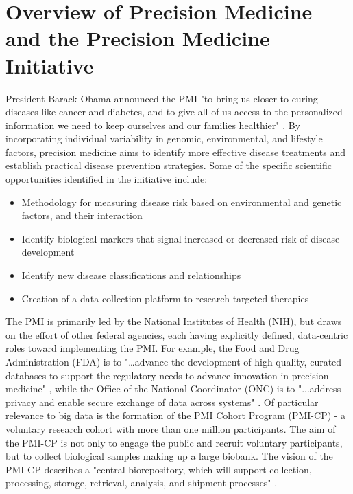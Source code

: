 \section{Overview of Precision Medicine and the Precision Medicine Initiative}
President Barack Obama announced the PMI "to bring us closer to curing diseases like cancer and diabetes, and to give all of us access to the personalized information we need to keep ourselves and our families healthier" \cite{obamaVid}\cite{Terry2015}. By incorporating individual variability in genomic, environmental, and lifestyle factors, precision medicine aims to identify more effective disease treatments and establish practical disease prevention strategies. Some of the specific scientific opportunities identified in the initiative include: 

\begin{itemize}
  \setlength{\parskip}{1em}\item Methodology for measuring disease risk based on environmental and genetic factors, and their interaction
  \setlength{\parskip}{1em}\item Identify biological markers that signal increased or decreased risk of disease development
  \setlength{\parskip}{1em}\item Identify new disease classifications and relationships
  \setlength{\parskip}{1em}\item Creation of a data collection platform to research targeted therapies
\end{itemize}

\setlength{\parskip}{1em}\noindent The PMI is primarily led by the National Institutes of Health (NIH), but draws on the effort of other federal agencies, each having explicitly defined, data-centric roles toward implementing the PMI. For example, the Food and Drug Administration (FDA) is to "…advance the development of high quality, curated databases to support the regulatory needs to advance innovation in precision medicine" \cite{Hudson2015}, while the Office of the National Coordinator (ONC) is to "...address privacy and enable secure exchange of data across systems" \cite{Hudson2015}. Of particular relevance to big data is the formation of the PMI Cohort Program (PMI-CP) - a voluntary research cohort with more than one million participants. The aim of the PMI-CP is not only to engage the public and recruit voluntary participants, but to collect biological samples making up a large biobank. The vision of the PMI-CP describes a "central biorepository, which will support collection, processing, storage, retrieval, analysis, and shipment processes" \cite{Hudson2015}.

